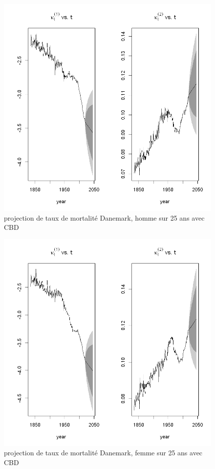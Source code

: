 \begin{figure}[!htb]
 \caption{projection de taux de mortalité Danemark, homme sur 25 ans avec CBD}
    \centering
    \includegraphics[scale =0.65]{output_25_0.png}
\end{figure}

\begin{figure}[!htb]
 \caption{projection de taux de mortalité Danemark, femme sur 25 ans avec CBD}
    \centering
    \includegraphics[scale =0.8]{output_25_1.png}
\end{figure}